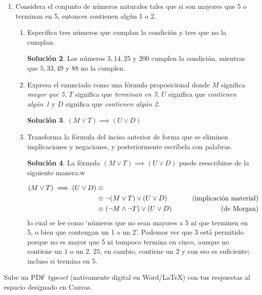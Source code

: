 \documentclass[]{book}
\theoremstyle{definition}
\newtheorem*{sol}{Solución}
\begin{document}
\begin{enumerate}
\begin{enumerate}
\begin{sol}
            $$C = \{c \mid A \iff B\}$$
            La doble implicación puede ser descompuesta fácilmente:
            \begin{align*}
                A \iff B & \equiv \\
                & \equiv A \implies B \wedge B \implies A & \tag{\text{definición de doble implicación}}\\
                & \equiv (\neg A \vee B) \wedge (\neg B \vee A) & \tag{\text{implicación material}}
            \end{align*}
            de tal modo que el conjunto $C = \{c \mid (\neg A \vee B) \wedge (\neg B \vee A)\}$
            que se leería como `cualquier palabra que no tenga $a$ o tenga $b$, y que además no tenga $b$ o tenga $a$'.
        \end{sol}
	\end{enumerate}
	\item Considera el conjunto de números naturales tales que si son mayores que 5 o terminan en 5, entonces contienen algún 1 o 2.
	\begin{enumerate}
		\item Especifica tres números que cumplan la condición y tres que no la cumplan.
		\begin{sol}
            Los números $3, 14, 25$ y $200$ cumplen la condición, mientras que $5, 33, 49$ y $88$ no la cumplen.
        \end{sol}
		\item Expresa el enunciado como una fórmula proposicional donde $M$ significa \textit{mayor que 5}, $T$ significa que \textit{terminan en 5}, $U$ significa que \textit{contienen algún 1} y $D$ significa que \textit{contienen algún 2}.
		\begin{sol}
            $(M \vee T) \implies (U \vee D)$
        \end{sol}
		\item Transforma la fórmula del inciso anterior de forma que se eliminen implicaciones y negaciones, y posteriormente escríbela con palabras.
		\begin{sol}
            La fórmula $(M \vee T) \implies (U \vee D)$ puede reescribirse de la siguiente manera:w

            \begin{align*}
                (M \vee T) \implies (U \vee D) & \equiv \\
                & \equiv \neg (M \vee T) \vee (U \vee D) & \tag{\text{implicación material}} \\
                & \equiv (\neg M \wedge \neg T) \vee (U \vee D) & \tag{\text{de Morgan}}
            \end{align*}
            lo cual se lee como `números que no sean mayores a 5 ni que terminen en 5, o bien que contengan un 1 o un 2'.
            Podemos ver que $3$ está permitido porque no es mayor que 5 ni tampoco termina en cinco, aunque no contiene un $1$ o un $2$.
            $25$, en cambio, contiene un 2 y con eso es suficiente; incluso si termina en 5.
        \end{sol}
	\end{enumerate}
    \end{enumerate}
    
    \vspace{0.5in}
    \noindent Sube un PDF \textit{typeset} (nativamente digital en Word/\LaTeX) con tus respuestas al espacio designado en Canvas.
\end{document}
